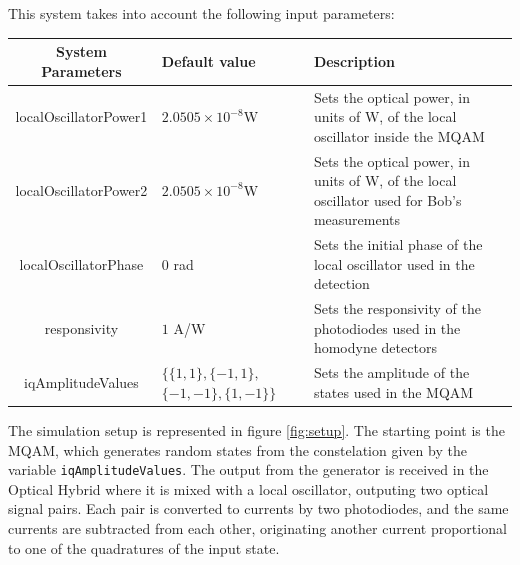 \begin{bibunit}[plain]
\begin{table}[H]
\begin{tabular}{|c|l|l|}
\hline
\end{tabular}
\end{table}
%
\vspace{2em}
%
This system takes into account the following input parameters:
\begin{table}[H]
\centering
\begin{tabulary}{1.0\textwidth}{|c|p{30mm}|p{70mm}|}
\hline
\textbf{System Parameters}	& {\bf Default value}		& \textbf{Description}\\
\hline
localOscillatorPower1		& $2.0505 \times 10^{-8}$W	& Sets the optical power, in units of W, of the local oscillator inside the MQAM\\
\hline
localOscillatorPower2		& $2.0505 \times 10^{-8}$W	& Sets the optical power, in units of W, of the local oscillator used for Bob's measurements\\
\hline
localOscillatorPhase		& $0$ rad					& Sets the initial phase of the local oscillator used in the detection\\
\hline
responsivity				& $1$ A/W					& Sets the responsivity of the photodiodes used in the homodyne detectors\\
\hline
iqAmplitudeValues			& $\{ \{ 1, 1 \}, \{ -1, 1 \},$ $ \{ -1, -1 \}, \{ 1, -1 \} \}$
														& Sets the amplitude of the states used in the MQAM\\
%
%
\hline
\end{tabulary}
\end{table}
%
\vspace{2em}
%
The simulation setup is represented in figure \ref{fig:setup}. The starting point is the MQAM, which generates random states from the constelation given by the variable \texttt{iqAmplitudeValues}. The output from the generator is received in the Optical Hybrid where it is mixed with a local oscillator, outputing two optical signal pairs. Each pair is converted to currents by two photodiodes, and the same currents are subtracted from each other, originating another current proportional to one of the quadratures of the input state.

\end{bibunit}
